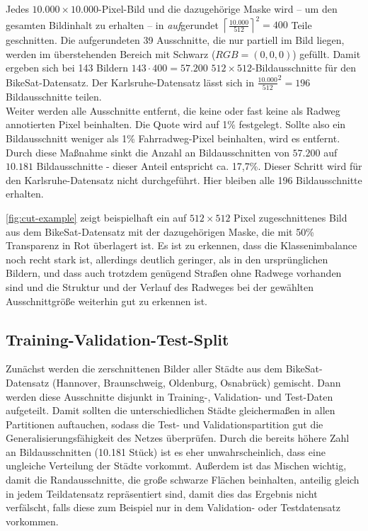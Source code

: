 Jedes $10.000{\times}10.000$-Pixel-Bild und die dazugehörige Maske wird -- um den gesamten Bildinhalt zu erhalten -- in \textit{auf}gerundet
$\left\lceil{\frac{10.000}{512}}\right\rceil^2 = 400$ Teile geschnitten. 
Die aufgerundeten 39 Ausschnitte, die nur partiell im Bild liegen, werden im überstehenden Bereich mit Schwarz ($RGB=(0,0,0)$) gefüllt.
Damit ergeben sich bei 143 Bildern $143 \cdot 400 = 57.200$ $512{\times}512$-Bildausschnitte für den BikeSat-Datensatz. 
Der Karlsruhe-Datensatz lässt sich in ${\frac{10.000}{512}}^2 = 196$ Bildausschnitte teilen.\\
Weiter werden alle Ausschnitte entfernt, die keine oder fast keine als Radweg annotierten Pixel beinhalten. 
Die Quote wird auf 1\% festgelegt. Sollte also ein Bildausschnitt weniger als 1\% Fahrradweg-Pixel beinhalten, 
wird es entfernt. Durch diese Maßnahme sinkt die Anzahl an Bildausschnitten von $57.200$ auf $10.181$ Bildausschnitte - 
dieser Anteil entspricht ca. 17,7\%. Dieser Schritt wird für den Karlsruhe-Datensatz nicht durchgeführt. Hier bleiben alle 196 
Bildausschnitte erhalten.
 
\autoref{fig:cut-example} zeigt beispielhaft ein auf $512{\times}512$ Pixel zugeschnittenes Bild aus dem BikeSat-Datensatz 
mit der dazugehörigen Maske, die mit 50\% Transparenz in Rot überlagert ist. Es ist zu erkennen, 
dass die Klassenimbalance noch recht stark ist, allerdings deutlich geringer, als in den ursprünglichen Bildern,
und dass auch trotzdem genügend Straßen ohne Radwege vorhanden sind und die Struktur und der Verlauf des Radweges 
bei der gewählten Ausschnittgröße weiterhin gut zu erkennen ist. 

\subsection{Training-Validation-Test-Split}

Zunächst werden die zerschnittenen Bilder aller Städte aus dem BikeSat-Datensatz 
(Hannover, Braunschweig, Oldenburg, Osnabrück) gemischt. Dann werden diese Ausschnitte disjunkt in 
Training-, Validation- und Test-Daten aufgeteilt. 
Damit sollten die unterschiedlichen Städte gleichermaßen in allen Partitionen auftauchen, 
sodass die Test- und Validationspartition gut die Generalisierungsfähigkeit des Netzes überprüfen. 
Durch die bereits höhere Zahl an Bildausschnitten (10.181 Stück) ist es eher unwahrscheinlich, 
dass eine ungleiche Verteilung der Städte vorkommt. Außerdem ist das Mischen wichtig, 
damit die Randausschnitte, die große schwarze Flächen beinhalten, anteilig gleich in 
jedem Teildatensatz repräsentiert sind, damit dies das Ergebnis nicht verfälscht, falls diese 
zum Beispiel nur in dem Validation- oder Testdatensatz vorkommen. 


